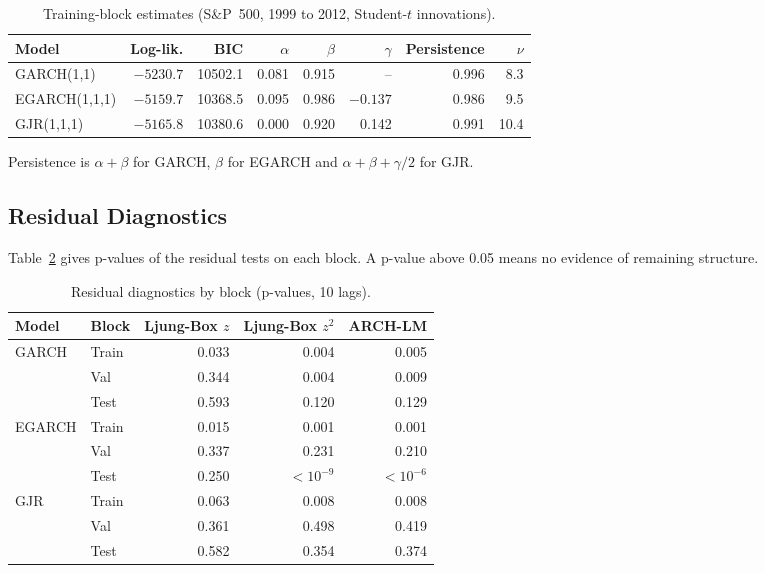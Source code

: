 \begin{table}[H]
\caption{Training-block estimates (S\&P~500, 1999 to 2012, Student-$t$ innovations).}
\label{tab:garch-fit}
\begin{center}
\small\setlength{\tabcolsep}{4pt}
\begin{tabular}{lrrrrrrr}
\hline
Model & Log-lik. & BIC & $\alpha$ & $\beta$ & $\gamma$ & Persistence & $\nu$ \\
\hline
GARCH(1,1)    & $-5230.7$ & 10502.1 & 0.081 & 0.915 & --       & 0.996 & 8.3 \\
EGARCH(1,1,1) & $-5159.7$ & 10368.5 & 0.095 & 0.986 & $-0.137$ & 0.986 & 9.5 \\
GJR(1,1,1)    & $-5165.8$ & 10380.6 & 0.000 & 0.920 & 0.142    & 0.991 & 10.4 \\
\hline
\end{tabular}
\end{center}
\small Persistence is $\alpha+\beta$ for GARCH, $\beta$ for EGARCH and $\alpha+\beta+\gamma/2$ for GJR.
\end{table}

\subsection{Residual Diagnostics}
Table~\ref{tab:garch-diag} gives p-values of the residual tests on each block. A p-value
above 0.05 means no evidence of remaining structure.

\begin{table}[H]
\caption{Residual diagnostics by block (p-values, 10 lags).}
\label{tab:garch-diag}
\begin{center}
\begin{tabular}{llrrr}
\hline
Model & Block & Ljung-Box $z$ & Ljung-Box $z^2$ & ARCH-LM \\
\hline
GARCH  & Train & 0.033 & 0.004 & 0.005 \\
       & Val   & 0.344 & 0.004 & 0.009 \\
       & Test  & 0.593 & 0.120 & 0.129 \\
EGARCH & Train & 0.015 & 0.001 & 0.001 \\
       & Val   & 0.337 & 0.231 & 0.210 \\
       & Test  & 0.250 & $<10^{-9}$ & $<10^{-6}$ \\
GJR    & Train & 0.063 & 0.008 & 0.008 \\
       & Val   & 0.361 & 0.498 & 0.419 \\
       & Test  & 0.582 & 0.354 & 0.374 \\
\hline
\end{tabular}
\end{center}
\end{table}

